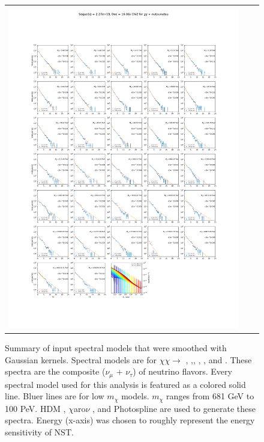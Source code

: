 \begin{figure}[!hb]
{\begin{tabular}{ccc}
            \includegraphics[clip, trim=22.1cm 6.5cm 19.5cm 56.5cm, scale=0.55]{figures/ic_DM/dm_plots/Segue1_nutaunutau_chi2_Masspanel_2024-03-23.pdf} \\
        \end{tabular}
    }\caption{Summary of input spectral models that were smoothed with Gaussian kernels. Spectral models are for $\chi\chi \rightarrow$ , \parpar{\mu},\parpar{\tau}, , \parpar{\nu_\mu}, and \parpar{\nu_\tau}. These spectra are the composite ($\nu_\mu$ + $\nu_\tau$) of neutrino flavors. Every spectral model used for this analysis is featured as a colored solid line. Bluer lines are for low $m_\chi$ models. $m_\chi$ ranges from 681 GeV to 100 PeV. HDM \cite{HDMSpectra}, $\chi$aro$\nu$ \cite{Charon}, and Photospline \cite{photospline} are used to generate these spectra. Energy (x-axis) was chosen to roughly represent the energy sensitivity of NST.}
    \label{fig:line_spectra_smooth}
\end{figure}

